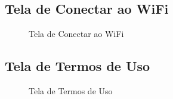 \subsection{Tela de Conectar ao WiFi}
\begin{figure}[H]
\centering
{}
\caption{Tela de Conectar ao WiFi}
\end{figure}

\subsection{Tela de Termos de Uso}
\begin{figure}[H]
\centering
{}
\caption{Tela de Termos de Uso}
\end{figure}


